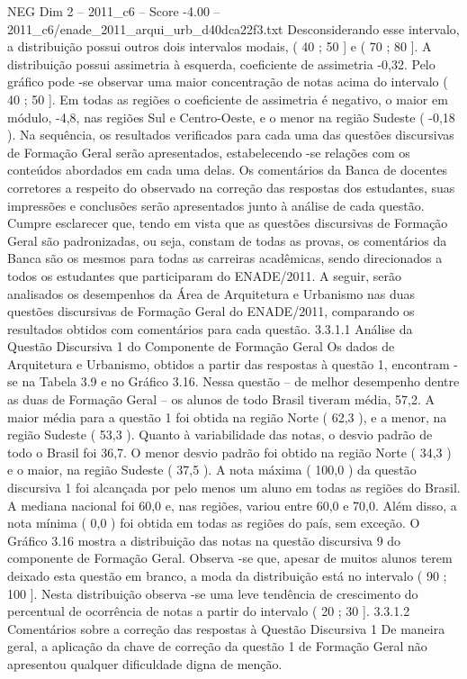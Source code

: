 \begin{textsample}{NEG Dim 2 – 2011\_c6 – Score -4.00 – 2011\_c6/enade\_2011\_arqui\_urb\_d40dca22f3.txt}
Desconsiderando esse intervalo, a distribuição possui outros dois intervalos modais, ( 40 ; 50 ] e ( 70 ; 80 ].
A distribuição possui assimetria à esquerda, coeficiente de assimetria -0,32.
Pelo gráfico pode -se observar uma maior concentração de notas acima do intervalo ( 40 ; 50 ].
Em todas as regiões o coeficiente de assimetria é negativo, o maior em módulo, -4,8, nas regiões Sul e Centro-Oeste, e o menor na região Sudeste ( -0,18 ).
Na sequência, os resultados verificados para cada uma das questões discursivas de Formação Geral serão apresentados, estabelecendo -se relações com os conteúdos abordados em cada uma delas.
Os comentários da Banca de docentes corretores a respeito do observado na correção das respostas dos estudantes, suas impressões e conclusões serão apresentados junto à análise de cada questão.
Cumpre esclarecer que, tendo em vista que as questões discursivas de Formação Geral são padronizadas, ou seja, constam de todas as provas, os comentários da Banca são os mesmos para todas as carreiras acadêmicas, sendo direcionados a todos os estudantes que participaram do ENADE/2011.
A seguir, serão analisados os desempenhos da Área de Arquitetura e Urbanismo nas duas questões discursivas de Formação Geral do ENADE/2011, comparando os resultados obtidos com comentários para cada questão. 3.3.1.1 Análise da Questão Discursiva 1 do Componente de Formação Geral Os dados de Arquitetura e Urbanismo, obtidos a partir das respostas à questão 1, encontram -se na Tabela 3.9 e no Gráfico 3.16.
Nessa questão – de melhor desempenho dentre as duas de Formação Geral – os alunos de todo Brasil tiveram média, 57,2.
A maior média para a questão 1 foi obtida na região Norte ( 62,3 ), e a menor, na região Sudeste ( 53,3 ).
Quanto à variabilidade das notas, o desvio padrão de todo o Brasil foi 36,7.
O menor desvio padrão foi obtido na região Norte ( 34,3 ) e o maior, na região Sudeste ( 37,5 ).
A nota máxima ( 100,0 ) da questão discursiva 1 foi alcançada por pelo menos um aluno em todas as regiões do Brasil.
A mediana nacional foi 60,0 e, nas regiões, variou entre 60,0 e 70,0.
Além disso, a nota mínima ( 0,0 ) foi obtida em todas as regiões do país, sem exceção.
O Gráfico 3.16 mostra a distribuição das notas na questão discursiva 9 do componente de Formação Geral.
Observa -se que, apesar de muitos alunos terem deixado esta questão em branco, a moda da distribuição está no intervalo ( 90 ; 100 ].
Nesta distribuição observa -se uma leve tendência de crescimento do percentual de ocorrência de notas a partir do intervalo ( 20 ; 30 ]. 3.3.1.2 Comentários sobre a correção das respostas à Questão Discursiva 1 De maneira geral, a aplicação da chave de correção da questão 1 de Formação Geral não apresentou qualquer dificuldade digna de menção.

\end{textsample}
